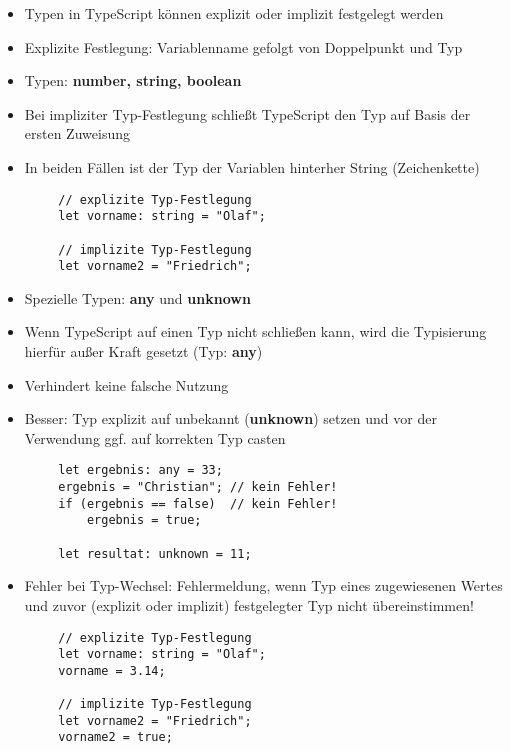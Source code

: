 \documentclass[10pt]{article}
\begin{document}
    \begin{tcolorbox}[
    colback=Orange!5!white,
    colframe=Orange!75!black,
    title={\centering Typen}]
    \begin{itemize}
        \item Typen in TypeScript können explizit oder implizit festgelegt werden
        \item Explizite Festlegung: Variablenname gefolgt von Doppelpunkt und Typ
        \item Typen: \textbf{number, string, boolean}
        \item Bei impliziter Typ-Festlegung schließt TypeScript den Typ auf Basis der ersten Zuweisung
        \item In beiden Fällen ist der Typ der Variablen hinterher String (Zeichenkette)
    \end{itemize}
    \begin{lstlisting}
        // explizite Typ-Festlegung
        let vorname: string = "Olaf";

        // implizite Typ-Festlegung
        let vorname2 = "Friedrich";
    \end{lstlisting}
    \begin{itemize}
        \item Spezielle Typen: \textbf{any} und \textbf{unknown}
        \item Wenn TypeScript auf einen Typ nicht schließen kann, wird die Typisierung hierfür außer Kraft gesetzt (Typ: \textbf{any})
        \item Verhindert keine falsche Nutzung
        \item Besser: Typ explizit auf unbekannt (\textbf{unknown}) setzen und vor der Verwendung ggf. auf korrekten Typ casten
    \end{itemize}
    \begin{lstlisting}
        let ergebnis: any = 33;
        ergebnis = "Christian"; // kein Fehler!
        if (ergebnis == false)  // kein Fehler!
            ergebnis = true;

        let resultat: unknown = 11;
    \end{lstlisting}
    \begin{itemize}
        \item Fehler bei Typ-Wechsel: Fehlermeldung, wenn Typ eines zugewiesenen Wertes und zuvor (explizit oder implizit) festgelegter Typ nicht übereinstimmen!
    \end{itemize}
    \begin{lstlisting}
        // explizite Typ-Festlegung
        let vorname: string = "Olaf";
        vorname = 3.14;

        // implizite Typ-Festlegung
        let vorname2 = "Friedrich";
        vorname2 = true;
    \end{lstlisting}
    \end{tcolorbox}
\end{document}
